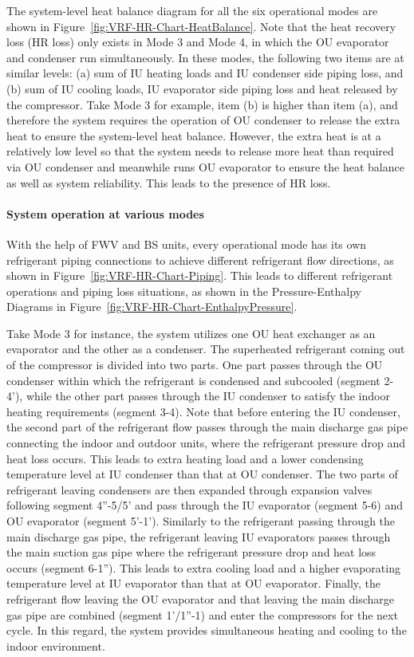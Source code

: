 The system-level heat balance diagram for all the six operational modes are shown in Figure~\ref{fig:VRF-HR-Chart-HeatBalance}. Note that the heat recovery loss (HR loss) only exists in Mode 3 and Mode 4, in which the OU evaporator and condenser run simultaneously. In these modes, the following two items are at similar levels: (a) sum of IU heating loads and IU condenser side piping loss, and (b) sum of IU cooling loads, IU evaporator side piping loss and heat released by the compressor. Take Mode 3 for example, item (b) is higher than item (a), and therefore the system requires the operation of OU condenser to release the extra heat to ensure the system-level heat balance. However, the extra heat is at a relatively low level so that the system needs to release more heat than required via OU condenser and meanwhile runs OU evaporator to ensure the heat balance as well as system reliability. This leads to the presence of HR loss.


\paragraph{System operation at various modes}\label{System-operation-at-various-modes}

With the help of FWV and BS units, every operational mode has its own refrigerant piping connections to achieve different refrigerant flow directions, as shown in Figure~\ref{fig:VRF-HR-Chart-Piping}. This leads to different refrigerant operations and piping loss situations, as shown in the Pressure-Enthalpy Diagrams in Figure~\ref{fig:VRF-HR-Chart-EnthalpyPressure}.

Take Mode 3 for instance, the system utilizes one OU heat exchanger as an evaporator and the other as a condenser. The superheated refrigerant coming out of the compressor is divided into two parts. One part passes through the OU condenser within which the refrigerant is condensed and subcooled (segment 2-4’), while the other part passes through the IU condenser to satisfy the indoor heating requirements (segment 3-4). Note that before entering the IU condenser, the second part of the refrigerant flow passes through the main discharge gas pipe connecting the indoor and outdoor units, where the refrigerant pressure drop and heat loss occurs. This leads to extra heating load and a lower condensing temperature level at IU condenser than that at OU condenser. The two parts of refrigerant leaving condensers are then expanded through expansion valves following segment 4”-5/5’ and pass through the IU evaporator (segment 5-6) and OU evaporator (segment 5’-1’). Similarly to the refrigerant passing through the main discharge gas pipe, the refrigerant leaving IU evaporators passes through the main suction gas pipe where the refrigerant pressure drop and heat loss occurs (segment 6-1”). This leads to extra cooling load and a higher evaporating temperature level at IU evaporator than that at OU evaporator. Finally, the refrigerant flow leaving the OU evaporator and that leaving the main discharge gas pipe are combined (segment 1’/1”-1) and enter the compressors for the next cycle. In this regard, the system provides simultaneous heating and cooling to the indoor environment. 

